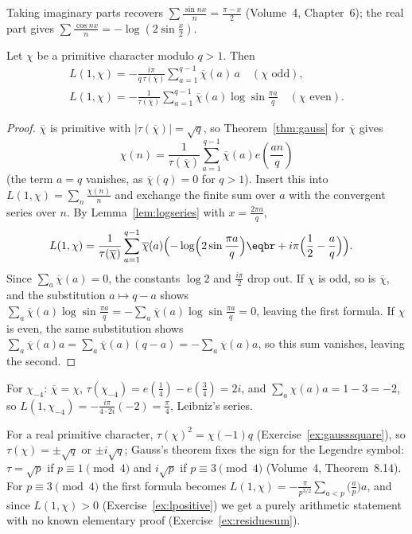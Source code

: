 Taking imaginary parts recovers $\sum\frac{\sin nx}n=\frac{\pi-x}2$ (Volume~4, Chapter~6); the real part gives $\sum\frac{\cos nx}n=-\log(2\sin\frac x2)$.

\begin{theorem}\label{thm:l1formula}
Let $\chi$ be a primitive character modulo $q>1$. Then
\[
\begin{gathered}L(1,\chi)=-\frac{i\pi}{q\,\tau(\overline\chi)}\sum_{a=1}^{q-1}\overline\chi(a)\,a\quad(\chi\text{ odd}),\\
L(1,\chi)=-\frac1{\tau(\overline\chi)}\sum_{a=1}^{q-1}\overline\chi(a)\log\sin\frac{\pi a}q\quad(\chi\text{ even}).\end{gathered}
\]
\end{theorem}
\begin{proof}
$\overline\chi$ is primitive with $|\tau(\overline\chi)|=\sqrt q$, so Theorem~\ref{thm:gauss} for $\overline\chi$ gives
\[
\chi(n)=\frac1{\tau(\overline\chi)}\sum_{a=1}^{q-1}\overline\chi(a)e(\frac{an}q)
\]
 (the term $a=q$ vanishes,
as $\overline\chi(q)=0$ for $q>1$). Insert this into $L(1,\chi)=\sum_n\frac{\chi(n)}n$ and exchange the finite sum over $a$ with the convergent series over $n$. By
Lemma~\ref{lem:logseries} with $x=\frac{2\pi a}q$,
\[
\begin{aligned}L(1,\chi)&=\frac1{\tau(\overline\chi)}\sum_{a=1}^{q-1}\overline\chi(a)\Bigl(-\log\Bigl(2\sin\frac{\pi a}q\Bigr)\eqbr+i\pi\Bigl(\frac12-\frac aq\Bigr)\Bigr).\end{aligned}
\]
Since $\sum_a\overline\chi(a)=0$, the constants $\log2$ and $\frac{i\pi}2$ drop out. If $\chi$ is odd, so is $\overline\chi$, and the substitution $a\mapsto q-a$ shows
$\sum_a\overline\chi(a)\log\sin\frac{\pi a}q=-\sum_a\overline\chi(a)\log\sin\frac{\pi a}q=0$, leaving the first formula. If $\chi$ is even, the same substitution shows
$\sum_a\overline\chi(a)a=\sum_a\overline\chi(a)(q-a)=-\sum_a\overline\chi(a)a$, so this sum vanishes, leaving the second.
\end{proof}

\begin{example}\label{ex:leibniz}
For $\chi_{-4}$: $\overline\chi=\chi$, $\tau(\chi_{-4})=e(\frac14)-e(\frac34)=2i$, and $\sum_a\chi(a)a=1-3=-2$, so $L(1,\chi_{-4})=-\frac{i\pi}{4\cdot2i}(-2)=\frac\pi4$, Leibniz's series.
\end{example}

For a real primitive character, $\tau(\chi)^2=\chi(-1)q$ (Exercise~\ref{ex:gausssquare}), so $\tau(\chi)=\pm\sqrt q$ or $\pm i\sqrt q$; Gauss's theorem fixes the sign
for the Legendre symbol: $\tau=\sqrt p$ if $p\equiv1\pmod4$ and $i\sqrt p$ if $p\equiv3\pmod4$ (Volume~4, Theorem~8.14). For $p\equiv3\pmod4$ the first formula
becomes $L(1,\chi)=-\frac\pi{p^{3/2}}\sum_{a<p}\bigl(\frac ap\bigr)a$, and since $L(1,\chi)>0$ (Exercise~\ref{ex:lpositive}) we get a purely arithmetic statement with no
known elementary proof (Exercise~\ref{ex:residuesum}).

